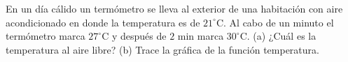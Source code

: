 \item En un día cálido un termómetro se lleva al exterior de una habitación con aire acondicionado en donde la temperatura es de $21^\circ\text{C}$. Al cabo de un minuto el termómetro marca $27^\circ\text{C}$ y después de $2 \text{ min}$ marca $30^\circ\text{C}$. (a) ¿Cuál es la temperatura al aire libre? (b) Trace la gráfica de la función temperatura.
